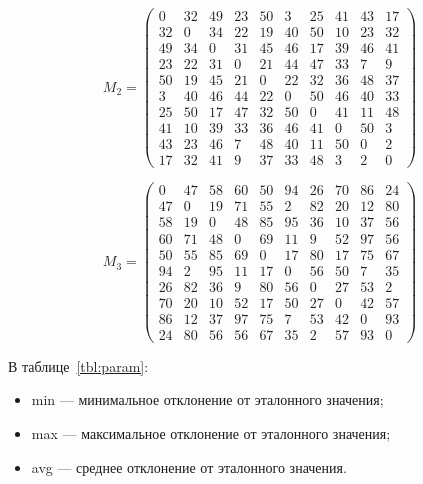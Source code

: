\documentclass{bmstu}
\begin{document}
\begin{equation}
\label{matrix:data_class_2}
M_{2} = \begin{pmatrix}
    0 & 32 & 49 & 23 & 50 & 3 & 25 & 41 & 43 & 17 \\
    32 & 0 & 34 & 22 & 19 & 40 & 50 & 10 & 23 & 32 \\
    49 & 34 & 0 & 31 & 45 & 46 & 17 & 39 & 46 & 41 \\
    23 & 22 & 31 & 0 & 21 & 44 & 47 & 33 & 7 & 9 \\
    50 & 19 & 45 & 21 & 0 & 22 & 32 & 36 & 48 & 37 \\
    3 & 40 & 46 & 44 & 22 & 0 & 50 & 46 & 40 & 33 \\
    25 & 50 & 17 & 47 & 32 & 50 & 0 & 41 & 11 & 48 \\
    41 & 10 & 39 & 33 & 36 & 46 & 41 & 0 & 50 & 3 \\
    43 & 23 & 46 & 7 & 48 & 40 & 11 & 50 & 0 & 2 \\
    17 & 32 & 41 & 9 & 37 & 33 & 48 & 3 & 2 & 0
\end{pmatrix}
\end{equation}

\begin{equation}
\label{matrix:data_class_3}
M_{3} = \begin{pmatrix}
    0 & 47 & 58 & 60 & 50 & 94 & 26 & 70 & 86 & 24 \\
    47 & 0 & 19 & 71 & 55 & 2 & 82 & 20 & 12 & 80 \\
    58 & 19 & 0 & 48 & 85 & 95 & 36 & 10 & 37 & 56 \\
    60 & 71 & 48 & 0 & 69 & 11 & 9 & 52 & 97 & 56 \\
    50 & 55 & 85 & 69 & 0 & 17 & 80 & 17 & 75 & 67 \\
    94 & 2 & 95 & 11 & 17 & 0 & 56 & 50 & 7 & 35 \\
    26 & 82 & 36 & 9 & 80 & 56 & 0 & 27 & 53 & 2 \\
    70 & 20 & 10 & 52 & 17 & 50 & 27 & 0 & 42 & 57 \\
    86 & 12 & 37 & 97 & 75 & 7 & 53 & 42 & 0 & 93 \\
    24 & 80 & 56 & 56 & 67 & 35 & 2 & 57 & 93 & 0
\end{pmatrix}
\end{equation}

В таблице~\ref{tbl:param}:
\begin{itemize}
    \item min --- минимальное отклонение от эталонного значения;
    \item max --- максимальное отклонение от эталонного значения;
    \item avg --- среднее отклонение от эталонного значения.
\end{itemize}
\end{document}
